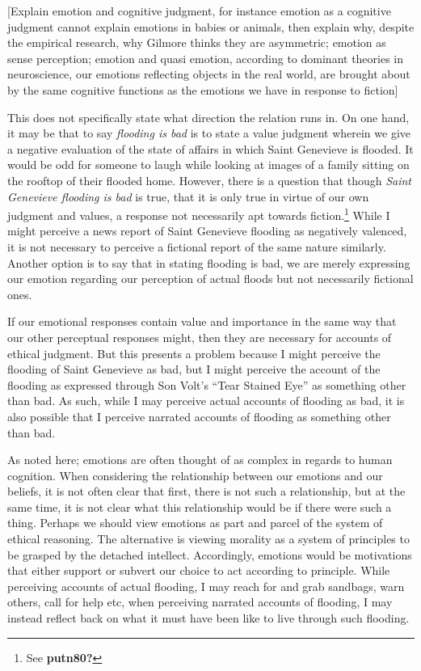 \documentclass[phdthesis,12pt,final]{wuthesis}
\theoremstyle{definition}
\theoremstyle{definition}
\theoremstyle{definition}
\theoremstyle{definition}
\theoremstyle{remark}
\begin{document}
{[}Explain emotion and cognitive judgment, for instance emotion as a cognitive judgment cannot explain emotions in babies or animals, then explain why, despite the empirical research, why Gilmore thinks they are asymmetric; emotion as sense perception; emotion and quasi emotion, according to dominant theories in neuroscience, our emotions reflecting objects in the real world, are brought about by the same cognitive functions as the emotions we have in response to fiction{]}

This does not specifically state what direction the relation runs in. On one hand, it may be that to say \emph{flooding is bad} is to state a value judgment wherein we give a negative evaluation of the state of affairs in which Saint Genevieve is flooded. It would be odd for someone to laugh while looking at images of a family sitting on the rooftop of their flooded home. However, there is a question that though \emph{Saint Genevieve flooding is bad} is true, that it is only true in virtue of our own judgment and values, a response not necessarily apt towards fiction.\footnote{See \textbf{putn80?}} While I might perceive a news report of Saint Genevieve flooding as negatively valenced, it is not necessary to perceive a fictional report of the same nature similarly. Another option is to say that in stating flooding is bad, we are merely expressing our emotion regarding our perception of actual floods but not necessarily fictional ones.

If our emotional responses contain value and importance in the same way that our other perceptual responses might, then they are necessary for accounts of ethical judgment. But this presents a problem because I might perceive the flooding of Saint Genevieve as bad, but I might perceive the account of the flooding as expressed through Son Volt's ``Tear Stained Eye'' as something other than bad. As such, while I may perceive actual accounts of flooding as bad, it is also possible that I perceive narrated accounts of flooding as something other than bad.

As noted here; emotions are often thought of as complex in regards to human cognition. When considering the relationship between our emotions and our beliefs, it is not often clear that first, there is not such a relationship, but at the same time, it is not clear what this relationship would be if there were such a thing. Perhaps we should view emotions as part and parcel of the system of ethical reasoning. The alternative is viewing morality as a system of principles to be grasped by the detached intellect. Accordingly, emotions would be motivations that either support or subvert our choice to act according to principle. While perceiving accounts of actual flooding, I may reach for and grab sandbags, warn others, call for help etc, when perceiving narrated accounts of flooding, I may instead reflect back on what it must have been like to live through such flooding.
\end{document}
